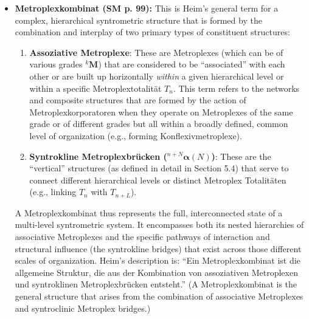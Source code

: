 \documentclass[12pt]{article}
\newcommand{\q}[1]{\enquote{#1}}
\newcommand{\metroplex}[1]{{}^{#1}\mathbf{M}}
\newcommand{\metroplextotalitaet}[1]{T_{#1}}
\newcommand{\syntroklinebruecke}[1]{{}^{#1}\bm{\alpha}}
\begin{document}
\begin{itemize}
    \item \textbf{Metroplexkombinat (SM p. 99):}
    This is Heim's general term for a complex, hierarchical syntrometric structure that is formed by the combination and interplay of two primary types of constituent structures:
    \begin{enumerate}
        \item \textbf{Assoziative Metroplexe}: These are Metroplexes (which can be of various grades \( \metroplex{k} \)) that are considered to be \q{associated} with each other or are built up horizontally \textit{within} a given hierarchical level or within a specific Metroplextotalität \( \metroplextotalitaet{n} \). This term refers to the networks and composite structures that are formed by the action of Metroplexkorporatoren when they operate on Metroplexes of the same grade or of different grades but all within a broadly defined, common level of organization (e.g., forming Konflexivmetroplexe).
        \item \textbf{Syntrokline Metroplexbrücken (\( \syntroklinebruecke{n+N}(N) \))}: These are the \q{vertical} structures (as defined in detail in Section 5.4) that serve to connect different hierarchical levels or distinct Metroplex Totalitäten (e.g., linking \( \metroplextotalitaet{n} \) with \( \metroplextotalitaet{n+L} \)).
    \end{enumerate}
    A Metroplexkombinat thus represents the full, interconnected state of a multi-level syntrometric system. It encompasses both its nested hierarchies of associative Metroplexes and the specific pathways of interaction and structural influence (the syntrokline bridges) that exist across those different scales of organization. Heim's description is: \q{Ein Metroplexkombinat ist die allgemeine Struktur, die aus der Kombination von assoziativen Metroplexen und syntroklinen Metroplexbrücken entsteht.} (A Metroplexkombinat is the general structure that arises from the combination of associative Metroplexes and syntroclinic Metroplex bridges.)


\end{itemize}
\end{document}

